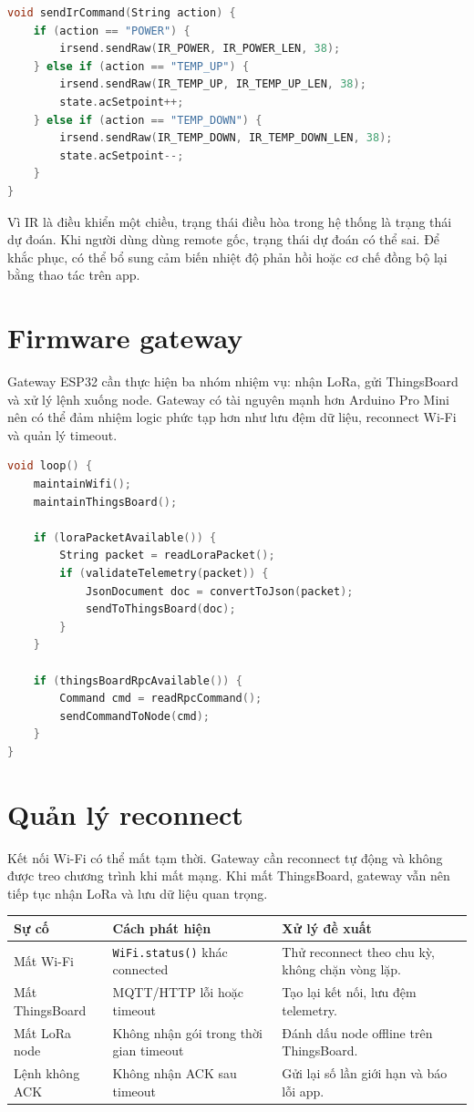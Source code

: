 \begin{lstlisting}[language=C,caption={Khung hàm phát lệnh IR}]
void sendIrCommand(String action) {
    if (action == "POWER") {
        irsend.sendRaw(IR_POWER, IR_POWER_LEN, 38);
    } else if (action == "TEMP_UP") {
        irsend.sendRaw(IR_TEMP_UP, IR_TEMP_UP_LEN, 38);
        state.acSetpoint++;
    } else if (action == "TEMP_DOWN") {
        irsend.sendRaw(IR_TEMP_DOWN, IR_TEMP_DOWN_LEN, 38);
        state.acSetpoint--;
    }
}
\end{lstlisting}

Vì IR là điều khiển một chiều, trạng thái điều hòa trong hệ thống là trạng thái dự đoán. Khi người dùng dùng remote gốc, trạng thái dự đoán có thể sai. Để khắc phục, có thể bổ sung cảm biến nhiệt độ phản hồi hoặc cơ chế đồng bộ lại bằng thao tác trên app.

\section{Firmware gateway}
Gateway ESP32 cần thực hiện ba nhóm nhiệm vụ: nhận LoRa, gửi ThingsBoard và xử lý lệnh xuống node. Gateway có tài nguyên mạnh hơn Arduino Pro Mini nên có thể đảm nhiệm logic phức tạp hơn như lưu đệm dữ liệu, reconnect Wi-Fi và quản lý timeout.

\begin{lstlisting}[language=C,caption={Luồng xử lý chính của gateway}]
void loop() {
    maintainWifi();
    maintainThingsBoard();

    if (loraPacketAvailable()) {
        String packet = readLoraPacket();
        if (validateTelemetry(packet)) {
            JsonDocument doc = convertToJson(packet);
            sendToThingsBoard(doc);
        }
    }

    if (thingsBoardRpcAvailable()) {
        Command cmd = readRpcCommand();
        sendCommandToNode(cmd);
    }
}
\end{lstlisting}

\section{Quản lý reconnect}
Kết nối Wi-Fi có thể mất tạm thời. Gateway cần reconnect tự động và không được treo chương trình khi mất mạng. Khi mất ThingsBoard, gateway vẫn nên tiếp tục nhận LoRa và lưu dữ liệu quan trọng.

\begin{longtable}{|p{3.5cm}|p{4.2cm}|p{5.3cm}|}
\hline
\textbf{Sự cố} & \textbf{Cách phát hiện} & \textbf{Xử lý đề xuất} \\
\hline
Mất Wi-Fi & \texttt{WiFi.status()} khác connected & Thử reconnect theo chu kỳ, không chặn vòng lặp. \\
\hline
Mất ThingsBoard & MQTT/HTTP lỗi hoặc timeout & Tạo lại kết nối, lưu đệm telemetry. \\
\hline
Mất LoRa node & Không nhận gói trong thời gian timeout & Đánh dấu node offline trên ThingsBoard. \\
\hline
Lệnh không ACK & Không nhận ACK sau timeout & Gửi lại số lần giới hạn và báo lỗi app. \\
\hline
\end{longtable}

